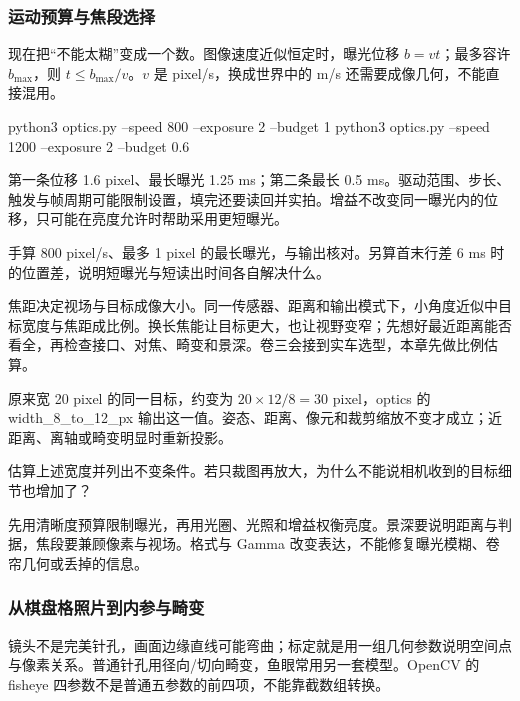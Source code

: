 \subsubsection{运动预算与焦段选择}
现在把“不能太糊”变成一个数。图像速度近似恒定时，曝光位移 $b=vt$；最多容许 $b_{\max}$，则 $t\le b_{\max}/v$。$v$ 是 pixel/s，换成世界中的 m/s 还需要成像几何，不能直接混用。
\begin{example}
\begin{tbash}
python3 optics.py --speed 800 --exposure 2 --budget 1
python3 optics.py --speed 1200 --exposure 2 --budget 0.6
\end{tbash}
第一条位移 1.6 pixel、最长曝光 1.25 ms；第二条最长 0.5 ms。驱动范围、步长、触发与帧周期可能限制设置，填完还要读回并实拍。增益不改变同一曝光内的位移，只可能在亮度允许时帮助采用更短曝光。
\end{example}
\begin{exercise}\label{ex:v2-camera-motion}
手算 800 pixel/s、最多 1 pixel 的最长曝光，与输出核对。另算首末行差 6 ms 时的位置差，说明短曝光与短读出时间各自解决什么。
\end{exercise}

焦距决定视场与目标成像大小。同一传感器、距离和输出模式下，小角度近似中目标宽度与焦距成比例。换长焦能让目标更大，也让视野变窄；先想好最近距离能否看全，再检查接口、对焦、畸变和景深。卷三会接到实车选型，本章先做比例估算。
\begin{example}[从 8 mm 换到 12 mm]
原来宽 20 pixel 的同一目标，约变为 $20\times12/8=30$ pixel，optics 的 width\_8\_to\_12\_px 输出这一值。姿态、距离、像元和裁剪缩放不变才成立；近距离、离轴或畸变明显时重新投影。
\end{example}
\begin{exercise}\label{ex:v2-camera-lens}
估算上述宽度并列出不变条件。若只裁图再放大，为什么不能说相机收到的目标细节也增加了？
\end{exercise}
\begin{conclusion}
先用清晰度预算限制曝光，再用光圈、光照和增益权衡亮度。景深要说明距离与判据，焦段要兼顾像素与视场。格式与 Gamma 改变表达，不能修复曝光模糊、卷帘几何或丢掉的信息。
\end{conclusion}

\subsubsection{从棋盘格照片到内参与畸变}
镜头不是完美针孔，画面边缘直线可能弯曲；标定就是用一组几何参数说明空间点与像素关系。普通针孔用径向/切向畸变，鱼眼常用另一套模型。OpenCV 的 fisheye 四参数不是普通五参数的前四项，不能靠截数组转换。

